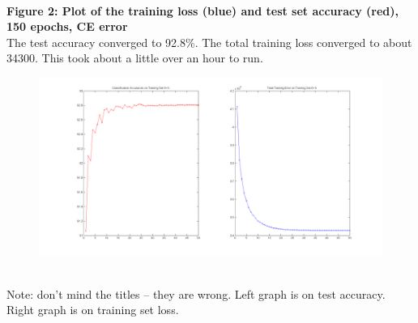 \documentclass[11pt]{article}
\begin{document}
\\
\textbf{Figure 2: Plot of the training loss (blue) and test set accuracy (red), 150 epochs, CE error} \\
The test accuracy converged to 92.8\%. The total training loss converged to about 34300. This took about a little over an hour to run.
\begin{figure}[ht!]
\centering
\includegraphics[width=150mm]{plots/finalp1ce.png}
\label{overflow}
\end{figure}
\\
Note: don't mind the titles -- they are wrong. Left graph is on test accuracy. Right graph is on training set loss.
\end{document}
